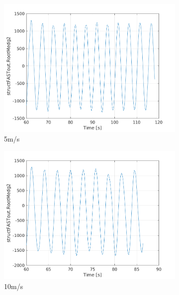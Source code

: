 \documentclass[10pt]{article}
\begin{document}
\begin{figure}[H]
  \centering
\begin{subfigure}{0.40\textwidth}
  \includegraphics[width=1\linewidth]{../CIP_6/FAST/Plots_ws5/RootMedg2.png}
  \caption{5m/s}
\end{subfigure}
\begin{subfigure}{0.40\textwidth}
  \includegraphics[width=1\linewidth]{../CIP_6/FAST/Plots_ws10/RootMedg2.png}
  \caption{10m/s}
\end{subfigure}
\begin{subfigure}{0.40\textwidth}

\end{subfigure}
\end{figure}
\end{document}
